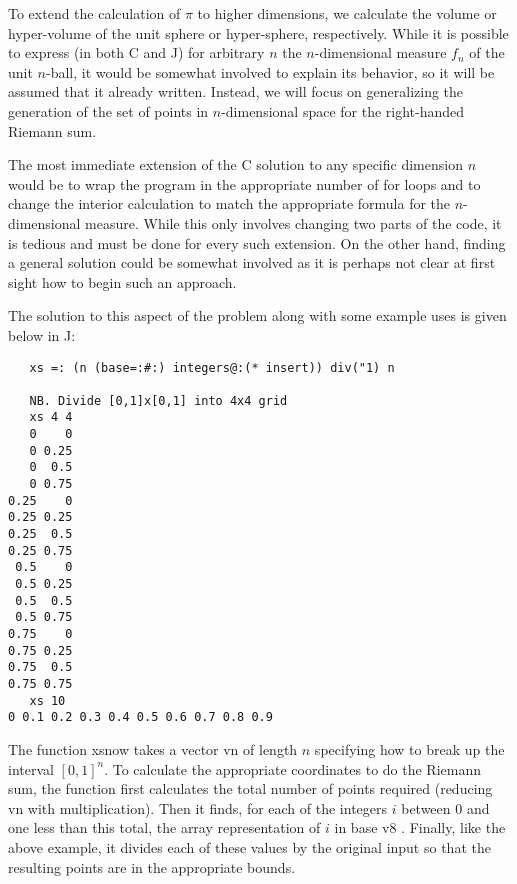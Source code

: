 To extend the calculation of $\pi$ to higher dimensions, 
we calculate the volume or hyper-volume of the unit sphere or hyper-sphere, respectively.
While it is possible to express (in both C and J) for arbitrary $n$ the $n$-dimensional measure $f_n$ of the unit $n$-ball, 
it would be somewhat involved to explain its behavior, so it will be assumed that it already written.
Instead, we will focus on generalizing the generation of 
the set of points in $n$-dimensional space for the right-handed Riemann sum.

The most immediate extension of the C solution to any specific dimension $n$
would be to wrap the program in the appropriate number of for loops 
and to change the interior calculation to match the appropriate formula for the $n$-dimensional measure.
While this only involves changing two parts of the code, it is tedious 
and must be done for every such extension. 
On the other hand, finding a general solution could be somewhat involved 
as it is perhaps not clear at first sight how to begin such an approach.

The solution to this aspect of the problem along with some example uses is given below in J:

\begin{singlespacing}
\begin{small}
\begin{verbatim}
   xs =: (n (base=:#:) integers@:(* insert)) div("1) n

   NB. Divide [0,1]x[0,1] into 4x4 grid
   xs 4 4
   0    0
   0 0.25
   0  0.5
   0 0.75
0.25    0
0.25 0.25
0.25  0.5
0.25 0.75
 0.5    0
 0.5 0.25
 0.5  0.5
 0.5 0.75
0.75    0
0.75 0.25
0.75  0.5
0.75 0.75
   xs 10
0 0.1 0.2 0.3 0.4 0.5 0.6 0.7 0.8 0.9
\end{verbatim}
\end{small}
\end{singlespacing}

The function \ttfamily xs\normalfont now takes a vector \ttfamily vn \normalfont of length $n$ 
specifying how to break up the interval $[0,1]^n$.
To calculate the appropriate coordinates to do the Riemann sum, 
the function first calculates the total number of points required (reducing \ttfamily vn \normalfont with multiplication). 
Then it finds, for each of the integers $i$ between 0 and one less than this total, 
the array representation of $i$ in base \ttfamily v8 \normalfont. 
Finally, like the above example, it divides each of these values by the original input 
so that the resulting points are in the appropriate bounds.


